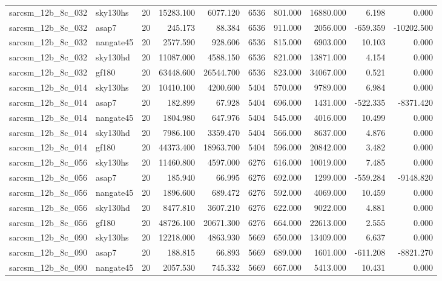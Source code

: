 \documentclass{article}
\begin{document}
\begin{longtable}{llrrrrrrrr}
sarcsm\_12b\_8c\_032 & sky130hs & 20 & 15283.100 & 6077.120 & 6536 & 801.000 & 16880.000 & 6.198 & 0.000 \\
sarcsm\_12b\_8c\_032 & asap7 & 20 & 245.173 & 88.384 & 6536 & 911.000 & 2056.000 & -659.359 & -10202.500 \\
sarcsm\_12b\_8c\_032 & nangate45 & 20 & 2577.590 & 928.606 & 6536 & 815.000 & 6903.000 & 10.103 & 0.000 \\
sarcsm\_12b\_8c\_032 & sky130hd & 20 & 11087.000 & 4588.150 & 6536 & 821.000 & 13871.000 & 4.154 & 0.000 \\
sarcsm\_12b\_8c\_032 & gf180 & 20 & 63448.600 & 26544.700 & 6536 & 823.000 & 34067.000 & 0.521 & 0.000 \\
sarcsm\_12b\_8c\_014 & sky130hs & 20 & 10410.100 & 4200.600 & 5404 & 570.000 & 9789.000 & 6.984 & 0.000 \\
sarcsm\_12b\_8c\_014 & asap7 & 20 & 182.899 & 67.928 & 5404 & 696.000 & 1431.000 & -522.335 & -8371.420 \\
sarcsm\_12b\_8c\_014 & nangate45 & 20 & 1804.980 & 647.976 & 5404 & 545.000 & 4016.000 & 10.499 & 0.000 \\
sarcsm\_12b\_8c\_014 & sky130hd & 20 & 7986.100 & 3359.470 & 5404 & 566.000 & 8637.000 & 4.876 & 0.000 \\
sarcsm\_12b\_8c\_014 & gf180 & 20 & 44373.400 & 18963.700 & 5404 & 596.000 & 20842.000 & 3.482 & 0.000 \\
sarcsm\_12b\_8c\_056 & sky130hs & 20 & 11460.800 & 4597.000 & 6276 & 616.000 & 10019.000 & 7.485 & 0.000 \\
sarcsm\_12b\_8c\_056 & asap7 & 20 & 185.940 & 66.995 & 6276 & 692.000 & 1299.000 & -559.284 & -9148.820 \\
sarcsm\_12b\_8c\_056 & nangate45 & 20 & 1896.600 & 689.472 & 6276 & 592.000 & 4069.000 & 10.459 & 0.000 \\
sarcsm\_12b\_8c\_056 & sky130hd & 20 & 8477.810 & 3607.210 & 6276 & 622.000 & 9022.000 & 4.881 & 0.000 \\
sarcsm\_12b\_8c\_056 & gf180 & 20 & 48726.100 & 20671.300 & 6276 & 664.000 & 22613.000 & 2.555 & 0.000 \\
sarcsm\_12b\_8c\_090 & sky130hs & 20 & 12218.000 & 4863.930 & 5669 & 650.000 & 13409.000 & 6.637 & 0.000 \\
sarcsm\_12b\_8c\_090 & asap7 & 20 & 188.815 & 66.893 & 5669 & 689.000 & 1601.000 & -611.208 & -8821.270 \\
sarcsm\_12b\_8c\_090 & nangate45 & 20 & 2057.530 & 745.332 & 5669 & 667.000 & 5413.000 & 10.431 & 0.000 \\

\end{longtable}
\end{document}

